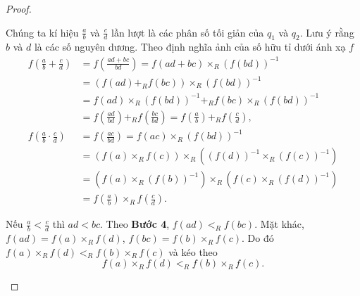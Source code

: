 \begin{proof}
\begin{enumerate}[label={\textbf{Bước \arabic*.}},itemindent=1cm]
              Chúng ta kí hiệu $\frac{a}{b}$ và $\frac{c}{d}$ lần lượt là các phân số tối giản của $q_{1}$ và $q_{2}$. Lưu ý rằng $b$ và $d$ là các số nguyên dương. Theo định nghĩa ảnh của số hữu tỉ dưới ánh xạ $f$
              \begingroup
              \allowdisplaybreaks
              \begin{align*}
                  f\left( \frac{a}{b} + \frac{c}{d} \right)   & = f\left( \frac{ad + bc}{bd} \right) = f(ad + bc)\times_{R} {(f(bd))}^{-1}                                                   \\
                                                              & = (f(ad) +_{R} f(bc)) \times_{R} {(f(bd))}^{-1}                                                                              \\
                                                              & = f(ad) \times_{R} {(f(bd))}^{-1} +_{R} f(bc) \times_{R} {(f(bd))}^{-1}                                                      \\
                                                              & = f\left(\frac{ad}{bd}\right) +_{R} f\left(\frac{bc}{bd}\right) = f\left(\frac{a}{b}\right) +_{R} f\left(\frac{c}{d}\right), \\
                  f\left( \frac{a}{b}\cdot\frac{c}{d} \right) & = f\left(\frac{ac}{bd}\right) = f(ac)\times_{R} {(f(bd))}^{-1}                                                               \\
                                                              & = (f(a)\times_{R} f(c)) \times_{R} ({(f(d))}^{-1}\times_{R} {(f(c))}^{-1})                                                   \\
                                                              & = (f(a)\times_{R} {(f(b))}^{-1}) \times_{R} (f(c)\times_{R} {(f(d))}^{-1})                                                   \\
                                                              & = f\left(\frac{a}{b}\right)\times_{R} f\left(\frac{c}{d}\right).
              \end{align*}
              \endgroup

              Nếu $\frac{a}{b} < \frac{c}{d}$ thì $ad < bc$. Theo \textbf{Bước 4}, $f(ad) <_{R} f(bc)$. Mặt khác, $f(ad) = f(a)\times_{R} f(d)$, $f(bc) = f(b) \times_{R} f(c)$. Do đó $f(a)\times_{R} f(d) <_{R} f(b)\times_{R} f(c)$ và kéo theo
              \[
                  f(a)\times_{R} f(d) <_{R} f(b)\times_{R} f(c).
              \]


\end{enumerate}
\end{proof}
